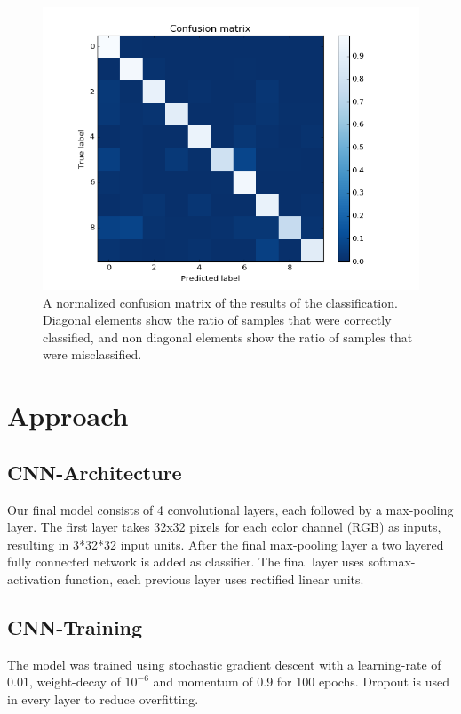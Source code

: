 \documentclass[	DIV=calc,%
				paper=a4,%
				fontsize=11pt,%
				twocolumn]{scrartcl}	 %
\begin{document}
\begin{figure}[H]
    \centering
    \includegraphics[width=0.9\linewidth]{data/sc_data/sc_mnist_confusion_matrix.png}
    \caption{A normalized confusion matrix of the results of the classification. Diagonal elements show the ratio of samples that were correctly classified, and non diagonal elements show the ratio of samples that were misclassified.}
    \label{sc_mnist_confusion_matrix}
\end{figure}


\section{Approach}

\subsection*{CNN-Architecture}
Our final model consists of 4 convolutional layers, each followed by a max-pooling layer. The first layer takes 32x32 pixels for each color channel (RGB) as inputs, resulting in 3*32*32 input units.
After the final max-pooling layer a two layered fully connected network is added as classifier. The final layer uses softmax-activation function, each previous layer uses rectified linear units.

\subsection*{CNN-Training}
The model was trained using stochastic gradient descent with a learning-rate of $0.01$, weight-decay of $10^{-6}$ and momentum of 0.9 for 100 epochs.
Dropout is used in every layer to reduce overfitting.
\end{document}
